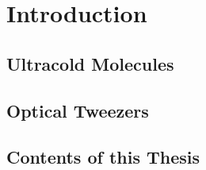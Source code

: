 
\chapter{Introduction}
\label{ch:introduction}


\section{Ultracold Molecules}
\label{ch:introduction:molecules}

\section{Optical Tweezers}
\label{ch:introduction:tweezers}

\section{Contents of this Thesis}
\label{ch:introduction:contents}
